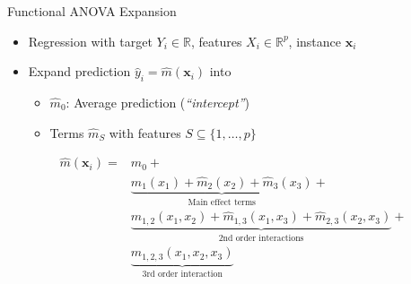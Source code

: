 \documentclass[aspectratio=169,12pt]{beamer}
\providecommand{\tightlist}{%
  \setlength{\itemsep}{2pt}\setlength{\parskip}{0pt}}
\begin{document}
\begin{frame}{Functional ANOVA Expansion}
\label{functional-anova-expansion-2}
\begin{itemize}
\tightlist
\item
  Regression with target \(Y_i \in \mathbb{R}\), features
  \(X_i \in \mathbb{R}^p\), instance \(\mathbf{x}_i\)
\item
  Expand prediction \(\hat{y}_i = \hat{m}(\mathbf{x}_i)\) into

  \begin{itemize}
  \tightlist
  \item
    \(\hat{m}_{0}\): Average prediction (\emph{``intercept''})
  \item
    Terms \(\hat{m}_S\) with features \(S \subseteq \{1, \ldots, p\}\)
  \end{itemize}
\end{itemize}

\vfill

\begin{align*}
\hat{m}(\mathbf{x}_i) = & \hat{m}_{0} + \\
&  \underbrace{\hat{m}_1(x_1) + \hat{m}_2(x_2) + \hat{m}_3(x_3)}_{\text{Main effect terms}} + \\
&  \underbrace{\hat{m}_{1,2}(x_1,x_2) + \hat{m}_{1,3}(x_1,x_3) + \hat{m}_{2,3}(x_2,x_3)}_{\text{2nd order interactions}} + \\ 
&  \underbrace{\hat{m}_{1,2,3}(x_1,x_2,x_3)}_{\text{3rd order interaction}}
\end{align*}

\vfill
\end{frame}
\end{document}
